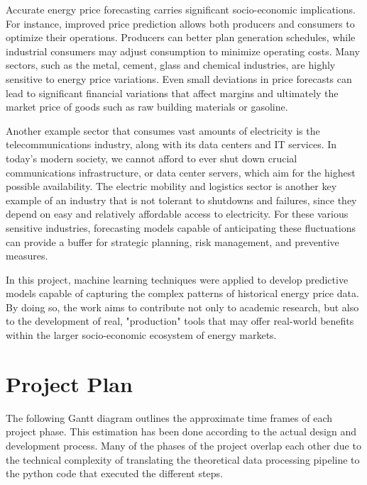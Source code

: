 \documentclass[12pt]{report} %
\begin{document}
Accurate energy price forecasting carries significant socio-economic implications. For instance, improved price prediction allows both producers and consumers to optimize their operations. Producers can better plan generation schedules, while industrial consumers may adjust consumption to minimize operating costs. Many sectors, such as the metal, cement, glass and chemical industries, are highly sensitive to energy price variations. Even small deviations in price forecasts can lead to significant financial variations that affect margins and ultimately the market price of goods such as raw building materials or gasoline.

Another example sector that consumes vast amounts of electricity is the telecommunications industry, along with its data centers and IT services. In today's modern society, we cannot afford to ever shut down crucial communications infrastructure, or data center servers, which aim for the highest possible availability.
The electric mobility and logistics sector is another key example of an industry that is not tolerant to shutdowns and failures, since they depend on easy and relatively affordable access to electricity. For these various sensitive industries, forecasting models capable of anticipating these fluctuations can provide a buffer for strategic planning, risk management, and preventive measures.

In this project, machine learning techniques were applied to develop predictive models capable of capturing the complex patterns of historical energy price data. By doing so, the work aims to contribute not only to academic research, but also to the development of real, "production" tools that may offer real-world benefits within the larger socio-economic ecosystem of energy markets.


\section{Project Plan}
The following Gantt diagram outlines the approximate time frames of each project phase. This estimation has been done according to the actual design and development process. Many of the phases of the project overlap each other due to the technical complexity of translating the theoretical data processing pipeline to the python code that executed the different steps.
\end{document}
